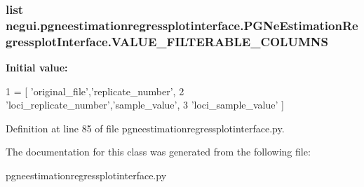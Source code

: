 \subsubsection[{\texorpdfstring{V\+A\+L\+U\+E\+\_\+\+F\+I\+L\+T\+E\+R\+A\+B\+L\+E\+\_\+\+C\+O\+L\+U\+M\+NS}{VALUE_FILTERABLE_COLUMNS}}]{\setlength{\rightskip}{0pt plus 5cm}list negui.\+pgneestimationregressplotinterface.\+P\+G\+Ne\+Estimation\+Regressplot\+Interface.\+V\+A\+L\+U\+E\+\_\+\+F\+I\+L\+T\+E\+R\+A\+B\+L\+E\+\_\+\+C\+O\+L\+U\+M\+NS\hspace{0.3cm}{\ttfamily [static]}}\hypertarget{classnegui_1_1pgneestimationregressplotinterface_1_1PGNeEstimationRegressplotInterface_ac73a3d5392244a1d765785ece87037e4}{}\label{classnegui_1_1pgneestimationregressplotinterface_1_1PGNeEstimationRegressplotInterface_ac73a3d5392244a1d765785ece87037e4}
{\bfseries Initial value\+:}
\begin{DoxyCode}
1 = [ \textcolor{stringliteral}{'original\_file'},\textcolor{stringliteral}{'replicate\_number'},
2                                 \textcolor{stringliteral}{'loci\_replicate\_number'},\textcolor{stringliteral}{'sample\_value'}, 
3                                                         \textcolor{stringliteral}{'loci\_sample\_value'} ]
\end{DoxyCode}


Definition at line 85 of file pgneestimationregressplotinterface.\+py.



The documentation for this class was generated from the following file\+:\begin{DoxyCompactItemize}
\item 
pgneestimationregressplotinterface.\+py\end{DoxyCompactItemize}
